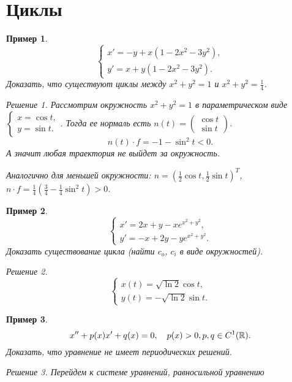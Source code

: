 \documentclass[a5paper, 11pt]{article}
\theoremstyle{definition}
\theoremstyle{plain}
\newtheorem{Ex}{Пример}
\theoremstyle{remark}
\newtheorem*{Solution}{Решение}
\begin{document}
	\section[21.04.2023]{Циклы}
	\begin{Ex}
		\[
		\begin{cases}
			x' = -y + x(1-2x^2-3y^2),\\
			y' = x+y(1-2x^2-3y^2).
		\end{cases}
		\]
		Доказать, что существуют циклы между $x^2+y^2=1$ и $x^2+y^2=\frac14$.
		\begin{Solution}
			Рассмотрим окружность $x^2+y^2=1$ в параметрическом виде $\begin{cases}
				x = \cos t,\\y=\sin t.
			\end{cases}$. Тогда ее нормаль есть $n(t) = \begin{pmatrix}
			\cos t \\ \sin t
		\end{pmatrix}$.
		\[
		n(t) \cdot f = -1-\sin^2 t  < 0.
		\]
		А значит любая траектория не выйдет за окружность.
		
		Аналогично для меньшей окружности:  $n = (\frac12 \cos t, \frac12 \sin t)^T$, $n\cdot f = \frac14 (\frac34 - \frac14 \sin^2 t) > 0$.
		\end{Solution}
	\end{Ex}
	\begin{Ex}
		\[
		\begin{cases}
			x' = 2x+y - xe^{x^2+y^2},\\
			y' = -x + 2y - ye^{x^2+y^2}.
		\end{cases}
		\]
		Доказать существование цикла (найти $c_o$, $c_i$ в виде окружностей).
		\begin{Solution}
			\[
			\begin{cases}
				x(t) = \sqrt{\ln2}\cos t,\\
				y(t) = -\sqrt{\ln2}\sin t.
			\end{cases}
			\]
		\end{Solution}
	\end{Ex}

	\begin{Ex}
		\[
		x'' + p(x) x' + q(x) = 0, \quad p(x) > 0, p, q \in C^1(\mathbb{R}).
		\]
		Доказать, что уравнение не имеет периодических решений.
		\begin{Solution}
			Перейдем к системе уравнений, равносильной уравнению
			\[
			
			\]
		\end{Solution}
		
	\end{Ex}
\end{document}
